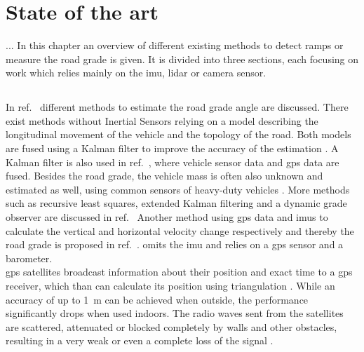 \chapter{State of the art}
\label{ch:StateOfTheArt}
...
In this chapter an overview of different existing methods to detect ramps or measure the road grade is given.
It is divided into three sections, each focusing on work which relies mainly on the \gls{imu}, \gls{lidar} or camera sensor.

\section{}
In ref.~\cite{Jauch2018} different methods to estimate the road grade angle are discussed.
There exist methods without Inertial Sensors relying on a model describing the longitudinal movement of the vehicle and the topology of the road.
Both models are fused using a Kalman filter to improve the accuracy of the estimation \cite{Sahlholm2007}.
A Kalman filter is also used in ref.~\cite{Sahlholm2010}, where vehicle sensor data and \gls{gps} data are fused.
Besides the road grade, the vehicle mass is often also unknown and estimated as well, using common sensors of heavy-duty vehicles \cite{Sahlholm2010, Maleej2014}.
More methods such as recursive least squares, extended Kalman filtering and a dynamic grade observer are discussed in ref.~\cite{Kidambi2014}
Another method using \gls{gps} data and \glspl{imu} to calculate the vertical and horizontal velocity change respectively and thereby the road grade is proposed in ref.~\cite{Ryu2004}.
\cite{YazdaniBoroujeni2014} omits the \gls{imu} and relies on a \gls{gps} sensor and a barometer.\\
\gls{gps} satellites broadcast information about their position and exact time to a \gls{gps} receiver, which than can calculate its position using triangulation \cite{Mainetti2014}.
While an accuracy of up to \SI{1}{\metre} can be achieved when outside, the performance significantly drops when used indoors.
The radio waves sent from the satellites are scattered, attenuated or blocked completely by walls and other obstacles, resulting in a very weak or even a complete loss of the signal \cite{Ozdenizci2015}.\\
